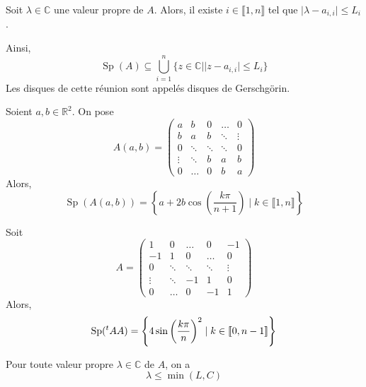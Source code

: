   \begin{theorem}
    \label{153-1}
    Soit $\lambda \in \mathbb{C}$ une valeur propre de $A$. Alors, il existe $i \in \llbracket 1, n \rrbracket$ tel que $\vert \lambda - a_{i,i} \vert \leq L_i$.
  \end{theorem}


  \begin{remark}
    Ainsi,
    \[ \operatorname{Sp}(A) \subseteq \bigcup_{i=1}^n \{ z \in \mathbb{C} \mid \vert z - a_{i,i} \vert \leq L_i \} \]
    Les disques de cette réunion sont appelés disques de Gerschgörin.
  \end{remark}


  \begin{example}
    Soient $a, b \in \mathbb{R}^2$. On pose
    \[
      A(a,b) =
       \begin{pmatrix}
         a & b & 0 & \dots & 0 \\
         b & a & b & \ddots & \vdots \\
         0 & \ddots & \ddots & \ddots & 0 \\
         \vdots & \ddots & b & a & b \\
         0 & \dots & 0 & b & a
       \end{pmatrix}
     \]
     Alors,
     \[ \operatorname{Sp}(A(a,b)) = \left\{ a + 2b \cos \left( \frac{k \pi}{n+1} \right) \mid k \in \llbracket 1, n \rrbracket \right\} \]
  \end{example}

  \begin{example}
    Soit
    \[
      A =
      \begin{pmatrix}
        1 & 0 & \dots & 0 & -1 \\
        -1 & 1 & 0 & \dots & 0 \\
        0 & \ddots & \ddots & \ddots & \vdots \\
        \vdots & \ddots & -1 & 1 & 0 \\
        0 & \dots & 0 & -1 & 1
      \end{pmatrix}
    \]
    Alors,
    \[ \operatorname{Sp}(\mathstrut ^t AA) = \left\{ 4 \sin \left( \frac{k \pi}{n} \right)^2 \mid k \in \llbracket 0, n-1 \rrbracket \right\} \]
  \end{example}


  \begin{corollary}
    Pour toute valeur propre $\lambda \in \mathbb{C}$ de $A$, on a
    \[ \lambda \leq \min(L,C) \]
  \end{corollary}

